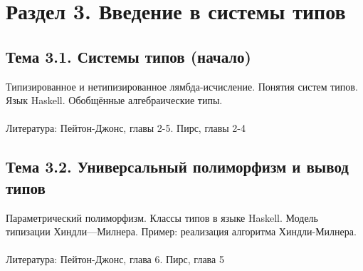 \documentclass[a4paper,11pt]{article}
\begin{document}
\section*{Раздел 3. Введение в системы типов}

\subsection*{Тема 3.1. Системы типов (начало)}
Типизированное и нетипизированное лямбда-исчисление. Понятия систем типов.
Язык Haskell. Обобщённые алгебраические типы.
\\\\
Литература: Пейтон-Джонс, главы 2-5. Пирс, главы 2-4

\subsection*{Тема 3.2. Универсальный полиморфизм и вывод типов}
Параметрический полиморфизм. Классы типов в языке Haskell. Модель типизации
Хиндли—Милнера. Пример: реализация алгоритма Хиндли-Милнера.
\\\\
Литература: Пейтон-Джонс, глава 6. Пирс, глава 5
\end{document}
